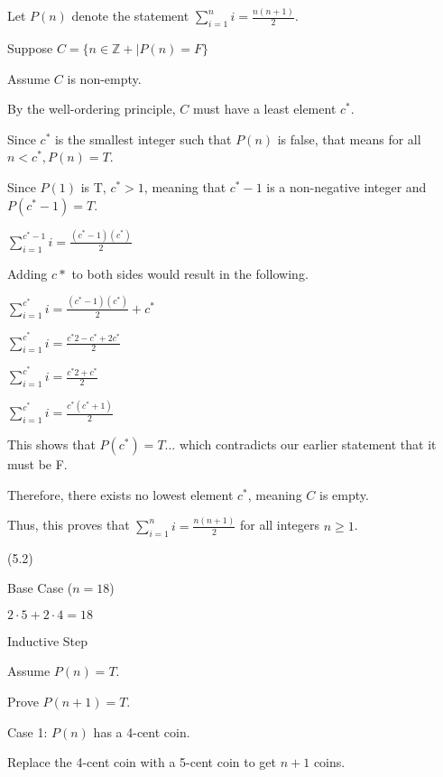 \documentclass{exam}
\begin{document}
\begin{questions}
\begin{center}

Let \(P(n)\) denote the statement \( \sum_{i=1}^{n} i = \frac{n(n+1)}{2} \).

Suppose \(C = \{n \in \mathbb{Z+} | P(n) = F\}\)

Assume \(C\) is non-empty.

By the well-ordering principle, \(C\) must have a least element \(c^*\).

Since \(c^*\) is the smallest integer such that \(P(n)\) is false, that means for all \(n < c^*, P(n) = T\).

Since \(P(1)\) is T, \(c^* > 1\), meaning that \(c^*-1\) is a non-negative integer and \(P(c^*-1) = T\).

\( \sum_{i=1}^{c^*-1} i = \frac{(c^*-1)(c^*)}{2} \)

Adding \(c*\) to both sides would result in the following.

\( \sum_{i=1}^{c^*} i = \frac{(c^*-1)(c^*)}{2} + c^* \)

\( \sum_{i=1}^{c^*} i = \frac{c^*2 - c^* + 2c^*}{2} \)

\( \sum_{i=1}^{c^*} i = \frac{c^*2 + c^*}{2} \)

\( \sum_{i=1}^{c^*} i = \frac{c^*(c^* + 1)}{2} \)

This shows that \(P(c^*) = T\)... which contradicts our earlier statement that it must be F.

Therefore, there exists no lowest element \(c^*\), meaning \(C\) is empty.

Thus, this proves that \( \sum_{i=1}^{n} i = \frac{n(n+1)}{2} \) for all integers \( n \geq 1 \).

\end{center}

 (5.2)

\begin{center}
Base Case (\(n = 18\))

\( 2 \cdot 5 + 2 \cdot 4 = 18 \)

\vspace{5px}

Inductive Step

Assume \( P(n) = T \).

Prove \( P(n+1) = T \).

Case 1: \(P(n)\) has a 4-cent coin.

Replace the 4-cent coin with a 5-cent coin to get \(n+1\) coins.
\vspace{5px}


\end{center}
\end{questions}
\end{document}
